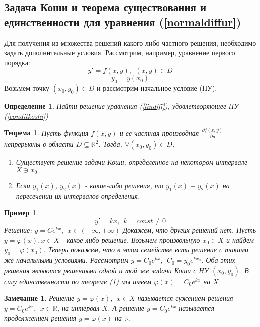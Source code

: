 \documentclass{article}
\newtheorem*{df}{Определение}
\newtheorem{teo}{Теорема}
\newtheorem*{ntc}{Замечание}
\newtheorem{xmp}{Пример}
\begin{document}
  \subsection{Задача Коши и теорема существования и единственности для уравнения (\ref{normaldiffur})}
  Для получения из множества решений какого-либо частного решения, необходимо задать дополнительные условия. Рассмотрим, например, уравнение первого порядка:
  \begin{equation}
  \label{lindiff}
     y' = f(x, y),~~ (x,y) \in D
  \end{equation}
  \begin{equation}
  \label{conditkoshi}
  y_0 = y(x_0)
  \end{equation}
  Возьмем точку $(x_0, y_0) \in D$ и рассмотрим начальное условие (НУ).
  \begin{df}
  Найти решение уравнения (\ref{lindiff}), удовлетворяющее НУ (\ref{conditkoshi})
  \end{df}
  
  \begin{teo}
  \label{koshi}
  Пусть функция $f(x, y)$ и ее частная производная $\frac{\partial f(x,y)}{\partial y}$ непрерывны в области $D\subseteq \mathbb{R}^2$. Тогда, $\forall (x_0, y_0) \in D$:
  \begin{enumerate}
  \item Существует решение задачи Коши, определенное на некотором интервале $ X \ni x_0 $
  \item Если $y_1(x)$, $y_2(x)$ - какие-либо решения, то $y_1(x) \equiv y_2(x)$ на пересечении их интервалов определения.
  \end{enumerate}
  \end{teo}
  
  \begin{xmp}
  $$ y' = kx ,~~ k = const \neq 0 $$
  Решение: $y = Ce^{kx}, ~~ x \in (-\infty, +\infty)$
  Докажем, что других решений нет. Пусть $y = \varphi(x), x \in X$ - какое-либо решение. Возьмем произвольную $x_0 \in X$ и найдем $y_0 = \varphi(x_0)$. Теперь покажем, что в этом семействе есть решение с такими же начальными условиями. Рассмотрим $ y = C_0 e^{kx},~~ C_0 = y_0e^{kx_0} $.  Оба этих решения являются решениями одной и той же задачи Коши с НУ $(x_0, y_0)$. В силу единственности по теореме (\ref{koshi}) мы имеем $\varphi(x)  = C_0 e^{kx}$ на $X$.
  \end{xmp}
  \begin{ntc}
  Решение $y = \varphi (x),~~ x \in X$ называется сужением решения $y = C_0e^{kx},~~ x \in \mathbb{R}$, на интервал $X$. А решение $y = C_0e^{kx}$ называется продолжением решения $y = \varphi (x)$ на $\mathbb{R} $.
  \end{ntc}
  
\end{document}
